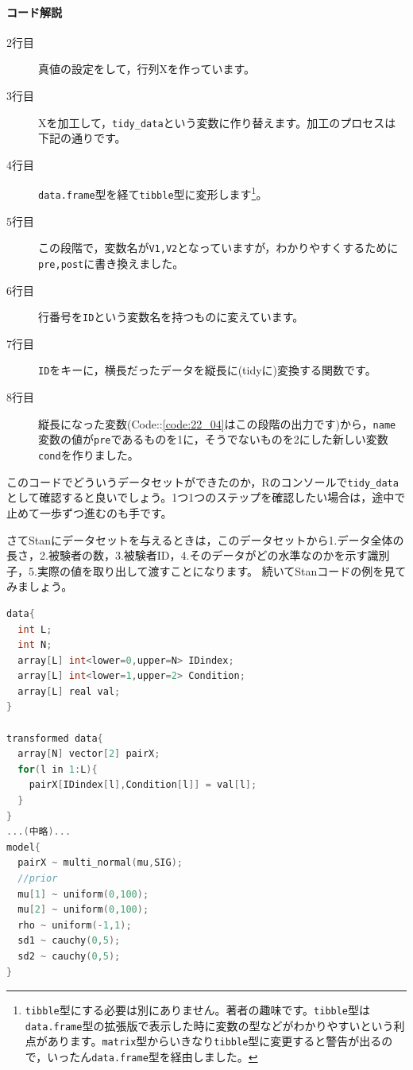 \documentclass{ltjsbook}
\begin{document}
\paragraph{コード解説}
\begin{description}
	\item[2行目] 真値の設定をして，行列Xを作っています。
	\item[3行目] Xを加工して，\verb|tidy_data|という変数に作り替えます。加工のプロセスは下記の通りです。
	\item[4行目] \verb|data.frame|型を経て\verb|tibble|型に変形します\footnote{\verb|tibble|型にする必要は別にありません。著者の趣味です。\verb|tibble|型は\verb|data.frame|型の拡張版で表示した時に変数の型などがわかりやすいという利点があります。\verb|matrix|型からいきなり\verb|tibble|型に変更すると警告が出るので，いったん\verb|data.frame|型を経由しました。}。
	\item[5行目] この段階で，変数名が\verb|V1,V2|となっていますが，わかりやすくするために\verb|pre,post|に書き換えました。
	\item[6行目] 行番号を\verb|ID|という変数名を持つものに変えています。
	\item[7行目] \verb|ID|をキーに，横長だったデータを縦長に(tidyに)変換する関数です。
	\item[8行目] 縦長になった変数(Code::\ref{code:22_04}はこの段階の出力です)から，\verb|name|変数の値が\verb|pre|であるものを1に，そうでないものを2にした新しい変数\verb|cond|を作りました。
\end{description}
このコードでどういうデータセットができたのか，Rのコンソールで\verb|tidy_data|として確認すると良いでしょう。1つ1つのステップを確認したい場合は，途中で止めて一歩ずつ進むのも手です。

さてStanにデータセットを与えるときは，このデータセットから1.データ全体の長さ，2.被験者の数，3.被験者ID，4.そのデータがどの水準なのかを示す識別子，5.実際の値を取り出して渡すことになります。
続いてStanコードの例を見てみましょう。

\begin{lstlisting}[language=C++,label={stan::22_03},caption={整然データ対応番}]
data{
  int L;
  int N;
  array[L] int<lower=0,upper=N> IDindex;
  array[L] int<lower=1,upper=2> Condition;
  array[L] real val;
}

transformed data{
  array[N] vector[2] pairX;
  for(l in 1:L){
    pairX[IDindex[l],Condition[l]] = val[l];
  }
}
...(中略)...
model{
  pairX ~ multi_normal(mu,SIG);
  //prior
  mu[1] ~ uniform(0,100);
  mu[2] ~ uniform(0,100);
  rho ~ uniform(-1,1);
  sd1 ~ cauchy(0,5);
  sd2 ~ cauchy(0,5);
}

\end{lstlisting}
\end{document}
